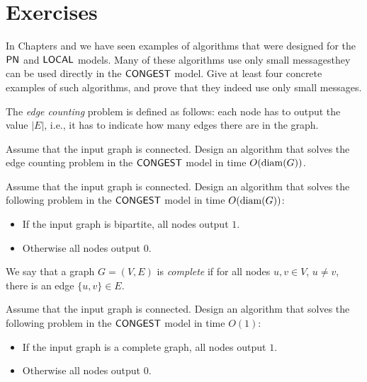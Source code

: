 \section{Exercises}

\begin{ex}\label{ex:congest-prior}
    In Chapters  and  we have seen examples of algorithms that were designed for the $\textup{\sffamily PN}$ and $\textup{\sffamily LOCAL}$ models. Many of these algorithms use only small messages\mydash they can be used directly in the $\textup{\sffamily CONGEST}$ model. Give at least four concrete examples of such algorithms, and prove that they indeed use only small messages.
\end{ex}

\begin{ex}
    The \emph{edge counting} problem is defined as follows: each node has to output the value $|E|$, i.e., it has to indicate how many edges there are in the graph.

    Assume that the input graph is connected. Design an algorithm that solves the edge counting problem in the $\textup{\sffamily CONGEST}$ model in time $O(\operatorname{diam}(G))$.
\end{ex}

\begin{ex}
    Assume that the input graph is connected. Design an algorithm that solves the following problem in the $\textup{\sffamily CONGEST}$ model in time $O(\operatorname{diam}(G))$:
    \begin{itemize}[noitemsep]
        \item If the input graph is bipartite, all nodes output $1$.
        \item Otherwise all nodes output $0$.
    \end{itemize}
\end{ex}

\begin{ex}
    We say that a graph $G = (V,E)$ is \emph{complete} if for all nodes $u, v \in V$, $u \ne v$, there is an edge $\{u,v\} \in E$.

    Assume that the input graph is connected. Design an algorithm that solves the following problem in the $\textup{\sffamily CONGEST}$ model in time $O(1)$:
    \begin{itemize}[noitemsep]
        \item If the input graph is a complete graph, all nodes output $1$.
        \item Otherwise all nodes output $0$.
    \end{itemize}
\end{ex}

